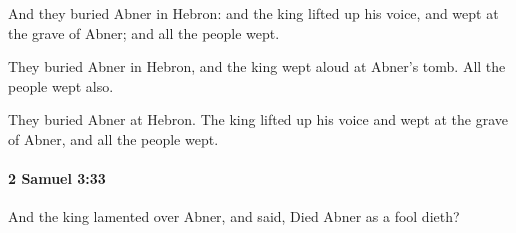			\begin{versebox}
					\item[BHS] 
					\item[ASV] And they buried Abner in Hebron: and the king lifted up his voice, and wept at the grave of Abner; and all the people wept.
					\item[NIV] They buried Abner in Hebron, and the king wept aloud at Abner’s tomb. All the people wept also.
					\item[NRSV] They buried Abner at Hebron. The king lifted up his voice and wept at the grave of Abner, and all the people wept.
			\end{versebox}

		\paragraph{2 Samuel 3:33} %
			\label{2SAMUEL-3-33}

			And the king lamented over Abner, and said, Died Abner as a fool dieth?

